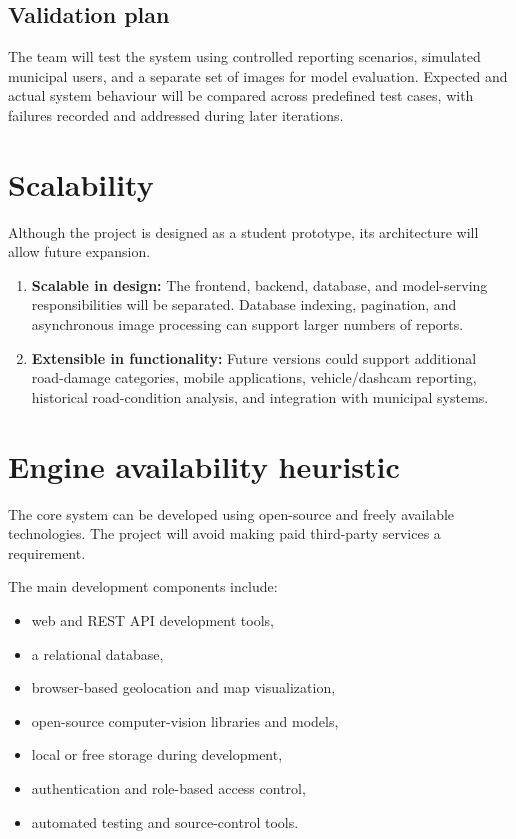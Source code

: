 \documentclass[11pt,a4paper]{article}
\begin{document}
\subsection{Validation plan}

The team will test the system using controlled reporting scenarios, simulated municipal users, and a separate set of images for model evaluation. Expected and actual system behaviour will be compared across predefined test cases, with failures recorded and addressed during later iterations.

\section{Scalability}

Although the project is designed as a student prototype, its architecture will allow future expansion.

\begin{enumerate}[leftmargin=0.6cm]

    \item \textbf{Scalable in design:} The frontend, backend, database, and model-serving responsibilities will be separated. Database indexing, pagination, and asynchronous image processing can support larger numbers of reports.

    \item \textbf{Extensible in functionality:} Future versions could support additional road-damage categories, mobile applications, vehicle/dashcam reporting, historical road-condition analysis, and integration with municipal systems.

\end{enumerate}

\section{Engine availability heuristic}

The core system can be developed using open-source and freely available technologies. The project will avoid making paid third-party services a requirement.

The main development components include:

\begin{itemize}[leftmargin=0.6cm]

    \item web and REST API development tools,
    \item a relational database,
    \item browser-based geolocation and map visualization,
    \item open-source computer-vision libraries and models,
    \item local or free storage during development,
    \item authentication and role-based access control,
    \item automated testing and source-control tools.

\end{itemize}
\end{document}
